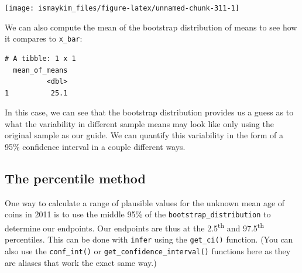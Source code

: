 \documentclass[12pt,]{krantz}
\makeatletter
\newenvironment{Shaded}{\begin{snugshade}}{\end{snugshade}}
\newcommand{\KeywordTok}[1]{\textcolor[rgb]{0.27,0.27,0.27}{\textbf{#1}}}
\newcommand{\DataTypeTok}[1]{\textcolor[rgb]{0.27,0.27,0.27}{#1}}
\newcommand{\FloatTok}[1]{\textcolor[rgb]{0.06,0.06,0.06}{#1}}
\newcommand{\StringTok}[1]{\textcolor[rgb]{0.5,0.5,0.5}{#1}}
\newcommand{\OperatorTok}[1]{\textcolor[rgb]{0.43,0.43,0.43}{\textbf{#1}}}
\newcommand{\NormalTok}[1]{#1}
\newenvironment{kframe}{%
\medskip{}
\setlength{\fboxsep}{.8em}
 \def\at@end@of@kframe{}%
 \ifinner\ifhmode%
  \def\at@end@of@kframe{\end{minipage}}%
  \begin{minipage}{\columnwidth}%
 \fi\fi%
 \def\FrameCommand##1{\hskip\@totalleftmargin \hskip-\fboxsep
 \colorbox{shadecolor}{##1}\hskip-\fboxsep
     \hskip-\linewidth \hskip-\@totalleftmargin \hskip\columnwidth}%
 \MakeFramed {\advance\hsize-\width
   \@totalleftmargin\z@ \linewidth\hsize
   \@setminipage}}%
 {\par\unskip\endMakeFramed%
 \at@end@of@kframe}
\renewenvironment{Shaded}{\begin{kframe}}{\end{kframe}}
\theoremstyle{definition}
\theoremstyle{definition}
\theoremstyle{definition}
\theoremstyle{remark}
\makeatother
\begin{document}
\begin{Shaded}
\end{Shaded}

\begin{center}\texttt{[image: ismaykim\_files/figure-latex/unnamed-chunk-311-1]} \end{center}

We can also compute the mean of the bootstrap distribution of means to
see how it compares to \texttt{x\_bar}:

\begin{Shaded}
\end{Shaded}

\begin{verbatim}
# A tibble: 1 x 1
  mean_of_means
          <dbl>
1          25.1
\end{verbatim}

In this case, we can see that the bootstrap distribution provides us a
guess as to what the variability in different sample means may look like
only using the original sample as our guide. We can quantify this
variability in the form of a 95\% confidence interval in a couple
different ways.

\subsection{The percentile method}\label{percentile-method}

One way to calculate a range of plausible values for the unknown mean
age of coins in 2011 is to use the middle 95\% of the
\texttt{bootstrap\_distribution} to determine our endpoints. Our
endpoints are thus at the 2.5\textsuperscript{th} and
97.5\textsuperscript{th} percentiles. This can be done with
\texttt{infer} using the \texttt{get\_ci()} function. (You can also use
the \texttt{conf\_int()} or \texttt{get\_confidence\_interval()}
functions here as they are aliases that work the exact same way.)

\begin{Shaded}
\end{Shaded}
\end{document}
